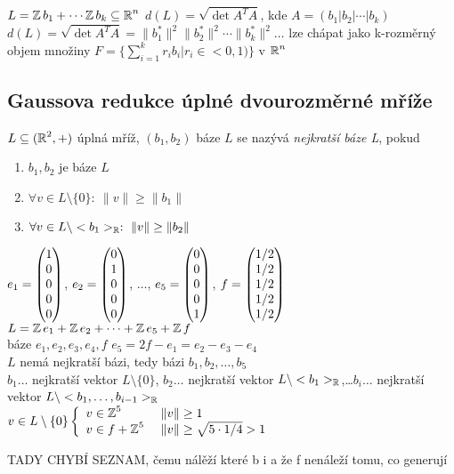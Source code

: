 \begin{reminder}
$L=\operatorname{\mathbb{Z}} b_1+\cdots\operatorname{\mathbb{Z}} b_k \subseteq\operatorname{\mathbb{R}}^n$ $d(L)=\sqrt{\det A^T A}$, kde $A=(b_1|b_2|\cdots|b_k)$\\
$d(L)=\sqrt{\det A^T A}=\|b_1^*\|^2\|b_2^*\|^2\cdots\|b_k^*\|^2\ldots$ lze chápat jako k-rozměrný objem množiny $F=\{\sum_{i=1}^{k}r_i b_i| r_i\in <0,1)\}$ v $\operatorname{\mathbb{R}}^n$\\
\end{reminder}

\subsection{Gaussova redukce úplné dvourozměrné mříže}
\begin{definition}
$L\subseteq (\operatorname{\mathbb{R}}^2,+)$ úplná mříž, $(b_1,b_2)$ báze $L$ se nazývá \emph{nejkratší báze L}, pokud 
\begin{enumerate}
    \item $b_1,b_2$ je báze $L$
    \item $\forall v\in L\setminus\{0\}:\ \|v\|\geq \|b_1\|$
    \item $\forall v\in L\setminus<b_1>_{\operatorname{\mathbb{R}}}:\ \|v\|\geq\|b_2\|$
\end{enumerate}
\end{definition}

\begin{example}
$e_1=\begin{pmatrix} 1 \\ 0 \\ 0 \\ 0 \\ 0 \end{pmatrix}$, $e_2=\begin{pmatrix} 0 \\ 1 \\ 0 \\ 0 \\ 0 \end{pmatrix}$, $\ldots$, $e_5=\begin{pmatrix} 0 \\ 0 \\ 0 \\ 0 \\ 1 \end{pmatrix}$, $f=\begin{pmatrix} 1/2 \\ 1/2 \\ 1/2 \\ 1/2 \\ 1/2 \end{pmatrix}$\\
$L=\operatorname{\mathbb{Z}} e_1+\operatorname{\mathbb{Z}} e_2+\cdots+\operatorname{\mathbb{Z}} e_5+\operatorname{\mathbb{Z}} f$\\
báze $e_1,e_2,e_3,e_4,f$ $e_5=2f-e_1=e_2-e_3-e_4$\\
$L$ nemá nejkratší bázi, tedy bázi $b_1,b_2,\ldots,b_5$\\
$b_1\ldots$ nejkratší vektor $L\setminus\{0\}$, $b_2\ldots$ nejkratší vektor $L\setminus<b_1>_{\operatorname{\mathbb{R}}}$,\ldots $b_i\ldots$ nejkratší vektor $L\setminus<b_1,\ldots,b_{i-1}>_{\operatorname{\mathbb{R}}}$\\
$v\in L\setminus\{0\}\left\{ \begin{array}{ll} v\in\operatorname{\mathbb{Z}}^5 & \mbox{ } \|v\|\geq 1 \\ v\in f+\operatorname{\mathbb{Z}}^5 & \mbox{ } \|v\|\geq\sqrt{5\cdot 1/4}>1 \end{array} \right.$


TADY CHYBÍ SEZNAM, čemu nálěží které b i a že f nenáleží tomu, co generují


\end{example}

